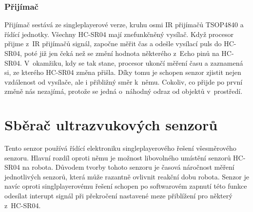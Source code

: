 \subsubsection{Přijímač}
Přijímač sestává ze singleplayerové verze, kruhu osmi IR přijímačů TSOP4840 a řídící jednotky.
Všechny HC-SR04 mají znefunkčněný vysílač.
Když procesor přijme z~IR přijímačů signál, započne měřit čas a odešle vysílací puls do HC-SR04, poté již jen čeká než se změní hodnota některého z~Echo pinů na HC-SR04.
V~okamžiku, kdy se tak stane, procesor ukončí měření času a zaznamená si, ze kterého HC-SR04 změna přišla.
Díky tomu je schopen senzor zjistit nejen vzdálenost od vysílače, ale i přibližný směr k~němu.
Cokoliv, co přijde po první změně nás nezajímá, protože se jedná o~náhodný odraz od objektů v~prostředí.

\section{Sběrač ultrazvukových senzorů}\label{Sberac}
Tento senzor používá řídící elektroniku singleplayerového řešení všesměrového senzoru.
Hlavní rozdíl oproti němu je možnost libovolného umístění senzorů HC-SR04 na robota.
Důvodem tvorby tohoto senzoru je časová náročnost měření jednotlivých senzorů, která může razantně ovlivnit reakční dobu robota.
Senzor je navíc oproti singlplayerovému řešení schopen po softwarovém zapnutí této funkce odesílat interupt signál při překročení nastavené meze přiblížení pro některý z~HC-SR04.